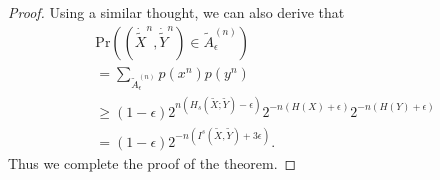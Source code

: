 \documentclass[12pt, draftclsnofoot,onecolumn]{IEEEtran}
\begin{document}
\begin{proof}
Using a similar thought, we can also derive that
\begin{equation}
\begin{aligned}
&\text{Pr}\left((\dot{\tilde{X}}^n,\dot{\tilde{Y}}^n)\in \tilde{A}_{\epsilon}^{(n)}\right)\\
&= \sum_{ \tilde{A}_{\epsilon}^{(n)}} p(x^n)p(y^n)\\
&\geq  (1-\epsilon)2^{n(H_s(\tilde{X};\tilde{Y})-\epsilon)}2^{-n\left(H(X)+\epsilon\right)}2^{-n\left(H(Y)+\epsilon\right)}\\
&= (1-\epsilon) 2^{-n\left(I^s(\tilde{X},\tilde{Y})+3\epsilon\right)}.
\end{aligned}
\end{equation}
Thus we complete the proof of the theorem.
\end{proof}
\end{document}
